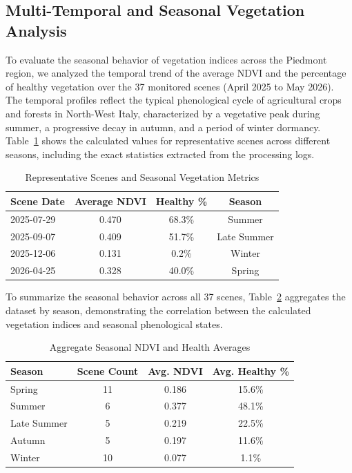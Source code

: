 \documentclass[10pt,conference,compsoc]{IEEEtran}
\begin{document}
\subsection{Multi-Temporal and Seasonal Vegetation Analysis}
To evaluate the seasonal behavior of vegetation indices across the Piedmont region, we analyzed the temporal trend of the average NDVI and the percentage of healthy vegetation over the 37 monitored scenes (April 2025 to May 2026). The temporal profiles reflect the typical phenological cycle of agricultural crops and forests in North-West Italy, characterized by a vegetative peak during summer, a progressive decay in autumn, and a period of winter dormancy.
Table~\ref{tab:temporal_representative_scenes} shows the calculated values for representative scenes across different seasons, including the exact statistics extracted from the processing logs.
\begin{table}[h]
\centering
\caption{Representative Scenes and Seasonal Vegetation Metrics}
\label{tab:temporal_representative_scenes}
\begin{tabular}{lccc}
\hline
\textbf{Scene Date} & \textbf{Average NDVI} & \textbf{Healthy \%} & \textbf{Season} \\ \hline
2025-07-29 & 0.470 & 68.3\% & Summer \\
2025-09-07 & 0.409 & 51.7\% & Late Summer \\
2025-12-06 & 0.131 & 0.2\%  & Winter \\
2026-04-25 & 0.328 & 40.0\% & Spring \\ \hline
\end{tabular}
\end{table}


To summarize the seasonal behavior across all 37 scenes, Table~\ref{tab:seasonal_averages} aggregates the dataset by season, demonstrating the correlation between the calculated vegetation indices and seasonal phenological states.
\begin{table}[h]
\centering
\caption{Aggregate Seasonal NDVI and Health Averages}
\label{tab:seasonal_averages}
\begin{tabular}{lccc}
\hline
\textbf{Season} & \textbf{Scene Count} & \textbf{Avg. NDVI} & \textbf{Avg. Healthy \%} \\ \hline
Spring  & 11 & 0.186 & 15.6\% \\
Summer  & 6 & 0.377 & 48.1\% \\
Late Summer  & 5 & 0.219 & 22.5\% \\
Autumn  & 5 & 0.197 & 11.6\% \\
Winter  & 10 & 0.077 & 1.1\% \\ \hline
\end{tabular}
\end{table}
\end{document}
